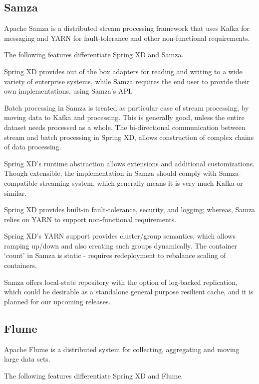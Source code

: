 \subsection{Samza}
Apache Samza\cite{samza} is a distributed stream processing framework that uses
Kafka for messaging and YARN for fault-tolerance and other non-functional
requirements.

The following features differentiate Spring XD and Samza.

\begin{itemize*}
\item Spring XD provides out of the box adapters for reading and writing to a wide
variety of enterprise systems, while Samza requires the end user to provide their
own implementations, using Samza's API.
\item Batch processing in Samza is treated as particular case of stream
processing, by moving data to Kafka and processing. This is generally good,
unless the entire dataset needs processed as a whole. The bi-directional
communication between stream and batch processing in Spring XD, allows construction
of complex chains of data processing.
\item Spring XD's runtime abstraction allows extensions and additional
customizations. Though extensible, the implementation in Samza should comply with
Samza-compatible streaming system, which generally means it is very much Kafka
or similar.
\item Spring XD provides built-in fault-tolerance, security, and logging; whereas,
Samza relies on YARN to support non-functional requirements.
\item Spring XD's YARN support provides cluster/group semantics, which allows
ramping up/down and also creating such groups dynamically. The container `count'
in Samza is static - requires redeployment to rebalance scaling of containers.
\end{itemize*}

Samza offers local-state repository with the option of log-backed replication,
which could be desirable as a standalone general purpose resilient cache, and it
is planned for our upcoming releases.

\subsection{Flume}
Apache Flume\cite{flume} is a distributed system for collecting, aggregating and
moving large data sets.

The following features differentiate Spring XD and Flume.

